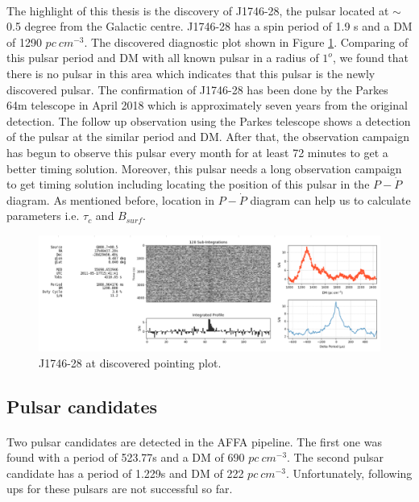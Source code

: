 \documentclass[thesis_msc.tex]{subfiles}
\begin{document}
    \paragraph{} The highlight of this thesis is the discovery of J1746-28, the pulsar located at $\sim$ 0.5 degree from the Galactic centre. J1746-28 has a spin period of 1.9 s and a DM of 1290 $pc~cm^{-3}$. The discovered diagnostic plot shown in Figure \ref{J1746}.  Comparing of this pulsar period and DM with all known pulsar in a radius of $1^o$, we found that there is no pulsar in this area which indicates that this pulsar is the newly discovered pulsar. The confirmation of J1746-28 has been done by the Parkes 64m telescope in April 2018 which is approximately seven years from the original detection. The follow up observation using the Parkes telescope shows a detection of the pulsar at the similar period and DM. After that, the observation campaign has begun to observe this pulsar every month for at least 72 minutes to get a better timing solution. Moreover, this pulsar needs a long observation campaign to get timing solution including locating the position of this pulsar in the $P-\dot{P}$ diagram. As mentioned before, location in $P-\dot{P}$ diagram can help us to calculate parameters i.e. $\tau_c$ and $B_{surf}$. 
    \begin{figure}[h]
\centering
\includegraphics[width=1.0\textwidth]{figures/J1746-28_D.png}
\caption{J1746-28 at discovered pointing plot.}\label{J1746}
\end{figure}
      \subsection{Pulsar candidates}
\paragraph{} Two pulsar candidates are detected in the AFFA pipeline. The first one was found with a period of 523.77s and a DM of 690 $pc~cm^{-3}$. The second pulsar candidate has a period of 1.229s and DM of 222 $pc~cm^{-3}$. Unfortunately, following ups for these pulsars are not successful so far.
     
\end{document}
